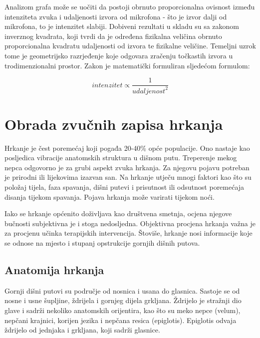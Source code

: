 Analizom grafa može se uočiti da postoji obrnuto proporcionalna ovisnost između intenziteta zvuka i udaljenosti izvora od mikrofona - što je izvor dalji od mikrofona, to je intenzitet slabiji. Dobiveni rezultati u skladu su sa zakonom inverznog kvadrata, koji tvrdi da je određena fizikalna veličina obrnuto proporcionalna kvadratu udaljenosti od izvora te fizikalne veličine. Temeljni uzrok tome je geometrijsko razrjeđenje koje odgovara zračenju točkastih izvora u trodimenzionalni prostor. Zakon je matematički formuliran sljedećom formulom: 

\begin{equation}
	intenzitet \propto \dfrac{1}{{udaljenost}^2}
\end{equation}



\section{Obrada zvučnih zapisa hrkanja}

Hrkanje je čest poremećaj koji pogađa 20-40\% opće populacije. Ono nastaje kao posljedica vibracije anatomskih struktura u dišnom putu. Treperenje mekog nepca odgovorno je za grubi aspekt zvuka hrkanja. Za njegovu pojavu potreban je prirodni ili lijekovima izazvan san. Na hrkanje utječu mnogi faktori kao što su položaj tijela, faza spavanja, dišni putevi i prisutnost ili odsutnost poremećaja disanja tijekom spavanja. Pojava hrkanja može varirati tijekom noći. \cite{pevernagie}

Iako se hrkanje općenito doživljava kao društvena smetnja, ocjena njegove bučnosti subjektivna je i stoga nedosljedna. Objektivna procjena hrkanja važna je za procjenu učinka terapijskih intervencija. Štoviše, hrkanje nosi informacije koje se odnose na mjesto i stupanj opstrukcije gornjih dišnih putova.

\subsection{Anatomija hrkanja}
Gornji dišni putovi su područje od nosnica i usana do glasnica. Sastoje se od nosne i usne šupljine, ždrijela i gornjeg dijela grkljana. Ždrijelo je stražnji dio glave i sadrži nekoliko anatomskih orijentira, kao što su meko nepce (velum), nepčani krajnici, korijen jezika i nepčana resica (epiglotis). Epiglotis odvaja ždrijelo od jednjaka i grkljana, koji sadrži glasnice.\cite{snoringml}

